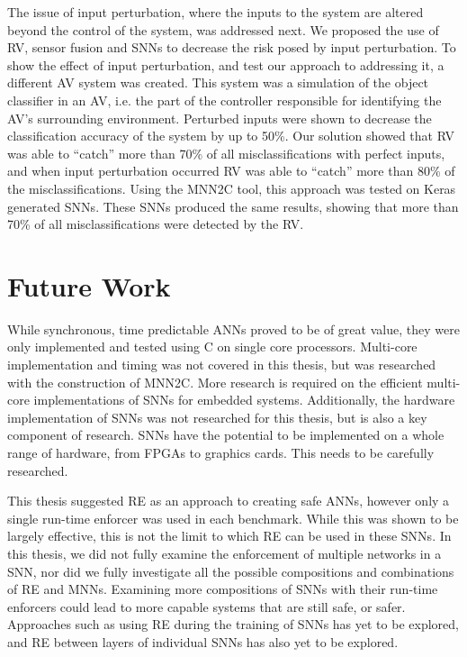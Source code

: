 The issue of input perturbation, where the inputs to the system are altered beyond the control of the system, was addressed next.
We proposed the use of \ac{RV}, sensor fusion and \acp{SNN} to decrease the risk posed by input perturbation.
To show the effect of input perturbation, and test our approach to addressing it, a different \ac{AV} system was created. 
This system was a simulation of the object classifier in an \ac{AV}, i.e. the part of the controller responsible for identifying the \ac{AV}'s surrounding environment.
Perturbed inputs were shown to decrease the classification accuracy of the system by up to 50\%.
Our solution showed that \ac{RV} was able to ``catch'' more than 70\% of all misclassifications with perfect inputs, and when input perturbation occurred \ac{RV} was able to ``catch'' more than 80\% of the misclassifications.
Using the \ac{MNN2C} tool, this approach was tested on Keras generated \acp{SNN}.
These \acp{SNN} produced the same results, showing that more than 70\% of all misclassifications were detected by the \ac{RV}.

\section{Future Work}

While synchronous, time predictable \acp{ANN} proved to be of great value, they were only implemented and tested using C on single core processors.
Multi-core implementation and timing was not covered in this thesis, but was researched with the construction of \ac{MNN2C}.
More research is required on the efficient multi-core implementations of \acp{SNN} for embedded systems.
Additionally, the hardware implementation of \acp{SNN} was not researched for this thesis, but is also a key component of research.
\acp{SNN} have the potential to be implemented on a whole range of hardware, from \acp{FPGA} to graphics cards.
This needs to be carefully researched. 

This thesis suggested \ac{RE} as an approach to creating safe \acp{ANN}, however only a single run-time enforcer was used in each benchmark.
While this was shown to be largely effective, this is not the limit to which \ac{RE} can be used in these \acp{SNN}.
In this thesis, we did not fully examine the enforcement of multiple networks in a \ac{SNN}, nor did we fully investigate all the possible compositions and combinations of \ac{RE} and \acp{MNN}.
Examining more compositions of \acp{SNN} with their run-time enforcers could lead to more capable systems that are still safe, or safer. 
Approaches such as using \ac{RE} during the training of \acp{SNN} has yet to be explored, and \ac{RE} between layers of individual \acp{SNN} has also yet to be explored.

